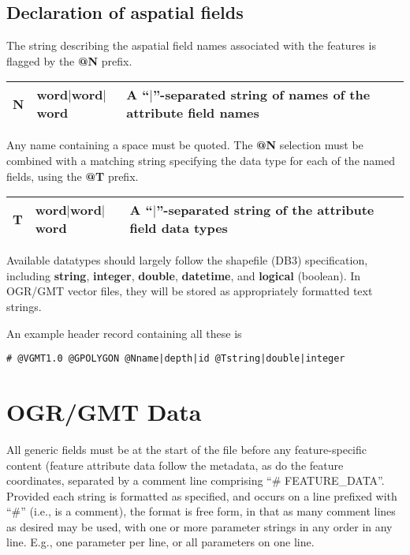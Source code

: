 \subsection{Declaration of aspatial fields}

The string describing the aspatial field names associated with the features is
flagged by the \textbf{@N} prefix.

\begin{table}[H]
\small
\centering
\begin{tabular}{|l|l|l|} \hline
N	&	word$|$word$|$word	&	A ``$|$''-separated string of names of the attribute field names \\ \hline
\end{tabular}
\label{tbl:Q3}
\end{table} 
\noindent
Any name containing a space must be quoted.   The \textbf{@N} selection must be combined with a matching string specifying the data type
for each of the named fields, using the \textbf{@T} prefix.
\begin{table}[H]
\small
\centering
\begin{tabular}{|l|l|l|} \hline
T	&	word$|$word$|$word	&		A ``$|$''-separated string of the attribute field data types \\ \hline
\end{tabular}
\label{tbl:Q4}
\end{table} 
\noindent
Available datatypes should largely follow the shapefile (DB3)
specification, including \textbf{string}, \textbf{integer}, \textbf{double},
\textbf{datetime}, and \textbf{logical} (boolean).
In OGR/GMT vector files, they will be stored as appropriately formatted text strings. 

An example header record containing all these is
\begin{verbatim}
# @VGMT1.0 @GPOLYGON @Nname|depth|id @Tstring|double|integer
\end{verbatim}

\section{OGR/GMT Data}

All generic fields must be at the start of the file before
any feature-specific content (feature attribute data follow the
metadata, as do the feature coordinates, separated by a comment line
comprising ``\# FEATURE\_DATA''.
Provided each string is formatted as specified, and occurs on a line
prefixed with ``\#'' (i.e., is a
comment), the format is free form, in that as many comment lines as
desired may be used, with one or more parameter strings in any order in
any line. E.g., one parameter per line, or all parameters on one line.

